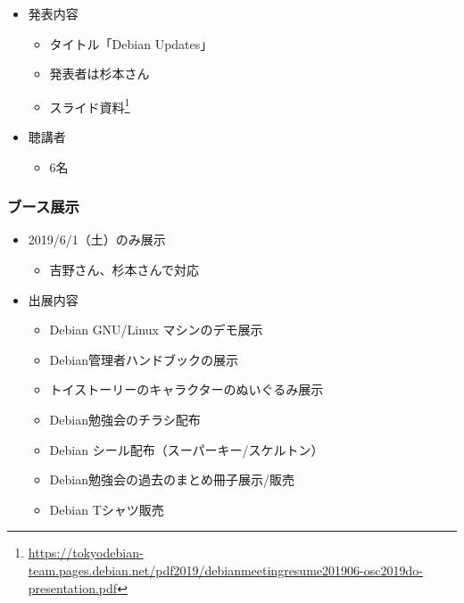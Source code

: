 \documentclass[mingoth,a4paper]{jsarticle}
\begin{document}
\begin{itemize}
\item 発表内容
  \begin{itemize}
  \item タイトル「Debian Updates」
  \item 発表者は杉本さん
  \item スライド資料\footnote{\url{https://tokyodebian-team.pages.debian.net/pdf2019/debianmeetingresume201906-osc2019do-presentation.pdf}}
  \end{itemize}
\end{itemize}

\begin{itemize}
\item 聴講者
  \begin{itemize}
   \item 6名
  \end{itemize}
\end{itemize}


\subsubsection{ブース展示}

\begin{itemize}
\item 2019/6/1（土）のみ展示
  \begin{itemize}
  \item 吉野さん、杉本さんで対応
  \end{itemize}
\end{itemize}

\begin{itemize}
\item 出展内容
  \begin{itemize}
  \item Debian GNU/Linux マシンのデモ展示
  \item Debian管理者ハンドブックの展示
  \item トイストーリーのキャラクターのぬいぐるみ展示
  \item Debian勉強会のチラシ配布
  \item Debian シール配布（スーパーキー/スケルトン）
  \item Debian勉強会の過去のまとめ冊子展示/販売
  \item Debian Tシャツ販売  
  \end{itemize}
\end{itemize}
\end{document}
